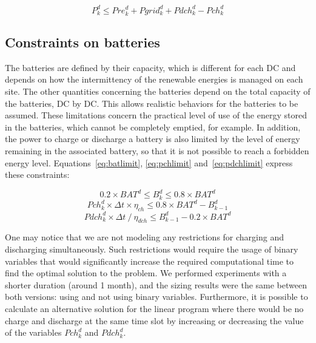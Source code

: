 \begin{equation} \label{eq:pkdconstraint}
    P^d_k \leq Pre^d_k + Pgrid^d_k + Pdch_k^d - Pch_k^d
\end{equation}

\subsection{Constraints on batteries}

The batteries are defined by their capacity, which is different for each DC and depends on how the intermittency of the renewable energies is managed on each site. The other quantities concerning the batteries depend on the total capacity of the batteries, DC by DC. This allows realistic behaviors for the batteries to be assumed. These limitations concern the practical level of use of the energy stored in the batteries, which cannot be completely emptied, for example. In addition, the power to charge or discharge a battery is also limited by the level of energy remaining in the associated battery, so that it is not possible to reach a forbidden energy level. Equations~\eqref{eq:batlimit}, \eqref{eq:pchlimit} and~\eqref{eq:pdchlimit} express these constraints:

\begin{equation} \label{eq:batlimit}
0.2\times BAT^d\leq B_k^d\leq 0.8\times BAT^d
\end{equation}
\begin{equation} \label{eq:pchlimit}
Pch^d_k \times \Delta t \times \eta_{ch} \leq 0.8\times BAT^d - B^d_{k-1}
\end{equation}
\begin{equation} \label{eq:pdchlimit}
Pdch^d_k \times \Delta t\ / \ \eta_{dch} \leq B^d_{k-1} - 0.2\times BAT^d
\end{equation}


One may notice that we are not modeling any restrictions for charging and discharging simultaneously. Such restrictions would require the usage of binary variables that would significantly increase the required computational time to find the optimal solution to the problem. We performed experiments with a shorter duration (around 1 month), and the sizing results were the same between both versions: using and not using binary variables. Furthermore, it is possible to calculate an alternative solution for the linear program where there would be no charge and discharge at the same time slot by increasing or decreasing the value of the variables $Pch_k^d$ and $Pdch_k^d$.

